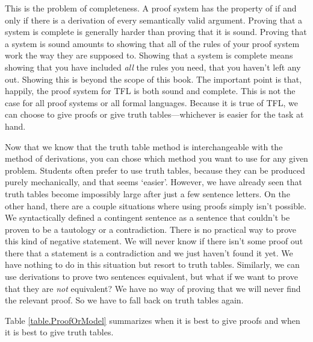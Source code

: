 This is the problem of completeness. A proof system has the property of   \label{def:completeness} if and only if there is a derivation of every semantically valid argument. Proving that a system is complete is generally harder than proving that it is sound. Proving that a system is sound amounts to showing that all of the rules of your proof system work the way they are supposed to. Showing that a system is complete means showing that you have included \emph{all} the rules you need, that you haven't left any out. Showing this is beyond the scope of this book. The important point is that, happily, the proof system for TFL is both sound and complete. This is not the case for all proof systems or all formal languages. Because it is true of TFL, we can choose to give proofs or give truth tables---whichever is easier for the task at hand.

Now that we know that the truth table method is interchangeable with the method of derivations, you can chose which method you want to use for any given problem. Students often prefer to use truth tables, because they can be produced  purely mechanically, and that seems `easier'. However, we have already seen that truth tables become impossibly large after just a few sentence letters. On the other hand, there are a couple situations where using proofs simply isn't possible. We syntactically defined a contingent sentence as a sentence that couldn't be proven to be a tautology or a contradiction. There is no practical way to prove this kind of negative statement. We will never know if there isn't some proof out there that a statement is a contradiction and we just haven't found it yet. We have nothing to do in this situation but resort to truth tables. Similarly, we can use derivations to prove two sentences equivalent, but what if we want to prove that they are \emph{not} equivalent? We have no way of proving that we will never find the relevant proof. So we have to fall back on truth tables again.

Table \ref{table.ProofOrModel} summarizes when it is best to give proofs and when it is best to give truth tables.

